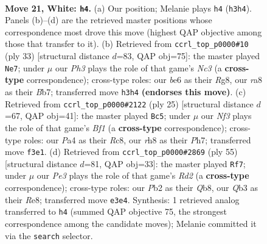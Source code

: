 \documentclass[11pt]{article}
\begin{document}
\clearpage

\begin{figure}[p]\centering
\begin{subfigure}{0.46\textwidth}\centering
\resizebox{\linewidth}{!}{%
\newchessgame
\chessboard[
  setfen={r4b1r/ppk3pp/2p1b3/q2p1p2/P2P4/1Q2PN1P/1PK2PP1/1RB4R w - - 5 21},
  showmover=false,
  pgfstyle=straightmove, color=movearrow, markmove={h3-h4}
]}
\caption{}
\end{subfigure}\hfill
\begin{subfigure}{0.46\textwidth}\centering
\resizebox{\linewidth}{!}{%
\newchessgame
\chessboard[
  setfen={r3k1r1/1b1p1p2/ppnBpq1p/6p1/2P5/P3Q3/1P3PPP/3RKB1R b Kq - 4 17},
  showmover=false,
  pgfstyle=straightmove, color=movearrow, markmove={c6-e7}
]}
\caption{}
\end{subfigure}
\\[4pt]
\begin{subfigure}{0.46\textwidth}\centering
\resizebox{\linewidth}{!}{%
\newchessgame
\chessboard[
  setfen={2r1kb1r/p1qp1ppp/Qp2pn2/8/2P5/5PP1/PP2BP1P/R1B2RK1 b k - 4 13},
  showmover=false,
  pgfstyle=straightmove, color=movearrow, markmove={f8-c5}
]}
\caption{}
\end{subfigure}\hfill
\begin{subfigure}{0.46\textwidth}\centering
\resizebox{\linewidth}{!}{%
\newchessgame
\chessboard[
  setfen={1q2r3/1p1r2pk/pBpb2pp/P6n/NPR1P3/7P/2Q2PP1/4R1K1 b - - 7 28},
  showmover=false,
  pgfstyle=straightmove, color=movearrow, markmove={d7-f7}
]}
\caption{}
\end{subfigure}
\caption{\textbf{Move 21, White: \texttt{h4}.} (a) Our position; Melanie plays \texttt{h4} (\texttt{h3h4}). Panels (b)--(d) are the retrieved master positions whose correspondence most drove this move (highest QAP objective among those that transfer to it). (b) Retrieved from \texttt{ccrl\_top\_p0000\#10} (ply 33) [structural distance $d$=83, QAP obj=75]: the master played \texttt{Ne7}; under $\mu$ our \emph{Ph3} plays the role of that game's \emph{Nc3} (a \textbf{cross-type} correspondence); cross-type roles: our \emph{b}e6 as their \emph{R}g8, our \emph{r}a8 as their \emph{B}b7; transferred move \texttt{h3h4} \textbf{(endorses this move)}. (c) Retrieved from \texttt{ccrl\_top\_p0000\#2122} (ply 25) [structural distance $d$=67, QAP obj=41]: the master played \texttt{Bc5}; under $\mu$ our \emph{Nf3} plays the role of that game's \emph{Bf1} (a \textbf{cross-type} correspondence); cross-type roles: our \emph{P}a4 as their \emph{R}c8, our \emph{r}h8 as their \emph{P}h7; transferred move \texttt{f3e1}. (d) Retrieved from \texttt{ccrl\_top\_p0000\#2869} (ply 55) [structural distance $d$=81, QAP obj=33]: the master played \texttt{Rf7}; under $\mu$ our \emph{Pe3} plays the role of that game's \emph{Rd2} (a \textbf{cross-type} correspondence); cross-type roles: our \emph{P}b2 as their \emph{Q}b8, our \emph{Q}b3 as their \emph{R}e8; transferred move \texttt{e3e4}. Synthesis: 1 retrieved analog transferred to \texttt{h4} (summed QAP objective 75, the strongest correspondence among the candidate moves); Melanie committed it via the \texttt{search} selector.}
\label{fig:thought-m40}
\end{figure}
\end{document}
